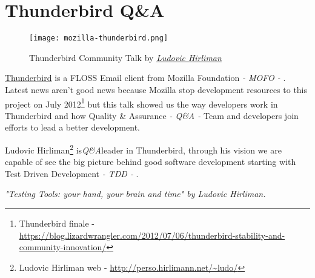 \section{Thunderbird Q\&A}
\label{sec:thunderbird-qa}

\begin{figure}[H]
\centering
\texttt{[image: mozilla-thunderbird.png]}   
\caption{Thunderbird Community Talk by \href{https://twitter.com/lhirlimann}{\emph{Ludovic Hirliman}}}
\label{thunderbird}
\end{figure}

\par \href{http://www.mozilla.org/es-ES/thunderbird/}{Thunderbird} is a FLOSS Email client from Mozilla Foundation \textit{- MOFO -} . Latest news aren't good news because Mozilla stop development resources to this project on July 2012\footnote{Thunderbird finale - \url{https://blog.lizardwrangler.com/2012/07/06/thunderbird-stability-and-community-innovation/}} but this talk showed us the way developers work in Thunderbird and how Quality \& Assurance \textit{- Q\&A -} Team and developers join efforts to lead a better development.

\par Ludovic Hirliman\footnote{Ludovic Hirliman web - \url{http://perso.hirlimann.net/~ludo/}} is\textit{Q\&A}leader in Thunderbird, through his vision we are capable of see the big picture behind good software development starting with Test Driven Development \textit{- TDD -} .

\begin{center}
    \textit{"Testing Tools: your hand, your brain and time" by Ludovic Hirliman.}
\end{center}

